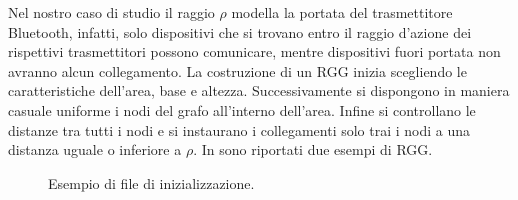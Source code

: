 Nel nostro caso di studio il raggio $\rho$ modella la portata del trasmettitore Bluetooth, infatti, solo dispositivi che si trovano entro il raggio d'azione dei rispettivi trasmettitori possono comunicare, mentre dispositivi fuori portata non avranno alcun collegamento. La costruzione di un \acs{RGG} inizia scegliendo le caratteristiche dell'area, base e altezza. Successivamente si dispongono in maniera casuale uniforme i nodi del grafo all'interno dell'area. Infine si controllano le distanze tra tutti i nodi e si instaurano i collegamenti solo trai i nodi a una distanza uguale o inferiore a $\rho$. In  sono riportati due esempi di \acs{RGG}.
\begin{figure}[t]
	\hfill
	\caption{Esempio di file di inizializzazione.}
	\label{fig:rgg_gen}
\end{figure}
